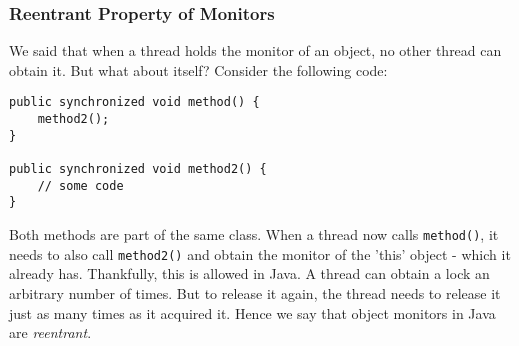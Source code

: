 \documentclass[main.tex]{subfiles}
\begin{document}
\subsubsection{Reentrant Property of Monitors}
We said that when a thread holds the monitor of an object, no other thread can obtain it. But what about itself? Consider the following code:
\begin{verbatim}
public synchronized void method() {
    method2();
}

public synchronized void method2() {
    // some code
}
\end{verbatim}
Both methods are part of the same class. When a thread now calls \texttt{method()}, it needs to also call \texttt{method2()} and obtain the monitor of the 'this' object - which it already has. Thankfully, this is allowed in Java. A thread can obtain a lock an arbitrary number of times. But to release it again, the thread needs to release it just as many times as it acquired it. Hence we say that object monitors in Java are \textit{reentrant}.


\end{document}
